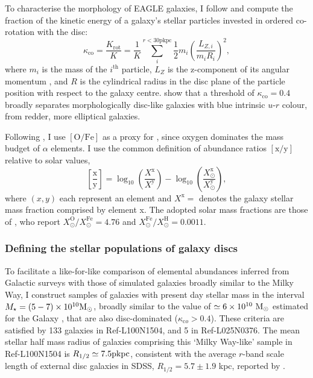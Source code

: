 To characterise the morphology of EAGLE galaxies, I follow \citet{2017arXiv170406283C} and compute the fraction of the kinetic energy of a galaxy's stellar particles invested in ordered co-rotation with the disc:
\begin{equation}
\kappa_{\mathrm{co}} = \frac{K_{\mathrm{rot}}}{K} = \frac{1}{K}\sum^{r < 30\mathrm{pkpc}}_i{\frac{1}{2}m_i\left(\frac{L_{Z,i}}{m_{i}R_{i}}\right)^{2}},
\end{equation}
where $m_i$ is the mass of the $i^{\mathrm{th}}$ particle, $L_Z$ is the z-component of its angular momentum , and $R$ is the cylindrical radius in the disc plane of the particle position with respect to the galaxy centre. \citet{2017arXiv170406283C} show that a threshold of $\kappa_{\mathrm{co}} = 0.4$ broadly separates morphologically disc-like galaxies with blue intrinsic $u$-$r$ colour, from redder, more elliptical galaxies. 

Following \citet{2016MNRAS.461L.102S}, I use $\mathrm{[O/Fe]}$ as a proxy for \afe{}, since oxygen dominates the mass budget of $\alpha$ elements. I use the common definition of abundance ratios $\mathrm{[x/y]}$ relative to solar values,
\begin{equation}
\left[\frac{\mathrm{x}}{\mathrm{y}}\right]  = \log_{10}{\left(\frac{X^{\mathrm{x}}}{X^{\mathrm{y}}}\right)} -  \log_{10}{\left(\frac{X_{\odot}^{\mathrm{x}}}{X_{\odot}^{\mathrm{y}}}\right)},
\end{equation}
where $(x,y)$ each represent an element and $X^{\mathrm{x}} = $ denotes the galaxy stellar mass fraction comprised by element x. The adopted solar mass fractions are those of \citet{2009ARA&A..47..481A}, who report $X_{\odot}^{\mathrm{O}}/X_{\odot}^{\mathrm{Fe}} = 4.76$ and $X_{\odot}^{\mathrm{Fe}}/X_{\odot}^{\mathrm{H}} = 0.0011$.


\subsubsection{Defining the stellar populations of galaxy discs}
\label{sec:disc_stellar_pops}

To facilitate a like-for-like comparison of elemental abundances inferred from Galactic surveys with those of simulated galaxies broadly similar to the Milky Way, I construct samples of galaxies with present day stellar mass in the interval $M_\star = (5 - 7) \times 10^{10} {\rm M}_\odot$, broadly similar to the value of $\simeq 6 \times 10^{10}~{\rm M}_\odot$ estimated for the Galaxy \citep[e.g.][]{2011MNRAS.414.2446M,2016ARA&A..54..529B}, that are also disc-dominated ($\kappa_{\mathrm co} > 0.4$). These criteria are satisfied by 133 galaxies in Ref-L100N1504, and 5 in Ref-L025N0376. The mean stellar half mass radius of galaxies comprising this `Milky Way-like' sample in Ref-L100N1504 is $R_{1/2} \simeq 7.5 {\rm pkpc}$, consistent with the average $r$-band scale length of external disc galaxies in SDSS, $R_{1/2} = 5.7 \pm 1.9$ kpc, reported by \citet{2010MNRAS.406.1595F}.

